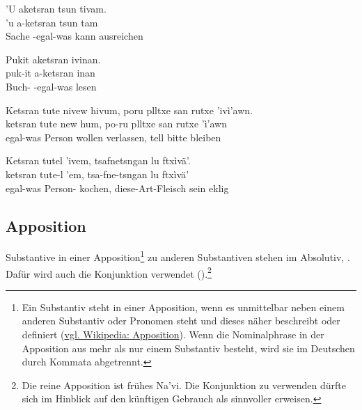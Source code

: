 \begin{interlin} \label{ketsran:ex01}
	\glll 'U aketsran tsun tivam. \\
	'u a-ketsran tsun tam \\
	Sache -egal-was kann ausreichen \\
	 \Ipawl{}
\end{interlin}

\begin{interlin} \label{ketsran:ex02}
	\glll Pukit aketsran ivinan. \\
	puk-it a-ketsran inan \\
	Buch- -egal-was lesen \\
	 \Ipawl{}
\end{interlin}

\begin{interlin} \label{ketsran:ex03}
	\glll Ketsran tute nivew hivum, poru plltxe san rutxe 'ivì'awn. \\
	ketsran tute new hum, po-ru plltxe san rutxe 'ì'awn\\
	egal-was Person wollen verlassen,  tell  bitte bleiben \\
	 \Ipawl{}
\end{interlin}

\begin{interlin} \label{ketsran:ex04}
	\glll Ketsran tutel 'ivem, tsafnetsngan lu ftxìvä'. \\
	ketsran tute-l 'em, tsa-fne-tsngan lu ftxìvä' \\
	egal-was Person- kochen, diese-Art-Fleisch sein eklig \\
	 \Ipawl{}
\end{interlin}
\noindent{}

\subsection{Apposition} Substantive in einer Apposition\footnote{Ein Substantiv steht in einer Apposition, wenn es unmittelbar neben einem anderen Substantiv oder Pronomen steht und dieses näher beschreibt oder definiert (\href{https://de.wikipedia.org/wiki/Apposition}{vgl. Wikipedia: Apposition}). Wenn die Nominalphrase in der Apposition aus mehr als nur einem Substantiv besteht, wird sie im Deutschen durch Kommata abgetrennt.} zu anderen Substantiven stehen im Absolutiv,  . Dafür wird auch die Konjunktion  verwendet ().\footnote{Die reine Apposition ist frühes Na’vi. Die Konjunktion  zu verwenden dürfte sich im Hinblick auf den künftigen Gebrauch als sinnvoller erweisen.} 

